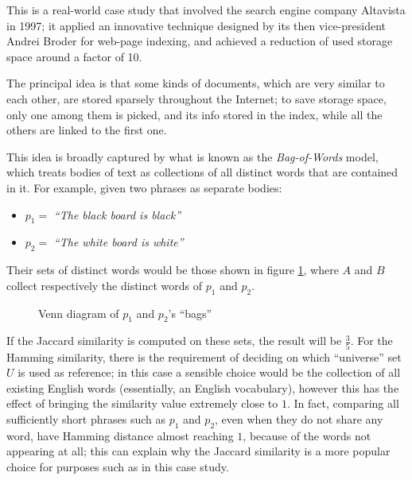 This is a real-world case study that involved the search engine company Altavista in 1997; it applied an innovative technique designed by its then vice-president Andrei Broder for web-page indexing, and achieved a reduction of used storage space around a factor of 10.

The principal idea is that some kinds of documents, which are very similar to each other, are stored sparsely throughout the Internet; to save storage space, only one among them is picked, and its info stored in the index, while all the others are linked to the first one.

This idea is broadly captured by what is known as the \emph{Bag-of-Words} model\footnotemark, which treats bodies of text as collections of all distinct words that are contained in it. For example, given two phrases as separate bodies:


\begin{itemize}
    \item $p_1 = $ \textit{``The black board is black''}
    \item $p_2 = $ \textit{``The white board is white''}
\end{itemize}

Their sets of distinct words would be those shown in figure \ref{fig:bow_venn}, where $A$ and $B$ collect respectively the distinct words of $p_1$ and $p_2$.

\begin{figure}[ht]
    \centering
    
    \caption{Venn diagram of $p_1$ and $p_2$'s ``bags''}
    \label{fig:bow_venn}
\end{figure}

If the Jaccard similarity is computed on these sets, the result will be $\frac{3}{5}$. For the Hamming similarity, there is the requirement of deciding on which ``universe'' set $U$ is used as reference; in this case a sensible choice would be the collection of all existing English words (essentially, an English vocabulary), however this has the effect of bringing the similarity value extremely close to $1$. In fact, comparing all sufficiently short phrases such as $p_1$ and $p_2$, even when they do not share any word, have Hamming distance almost reaching $1$, because of the words not appearing at all; this can explain why the Jaccard similarity is a more popular choice for purposes such as in this case study.

